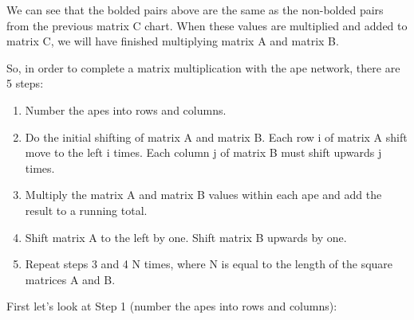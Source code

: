 \documentclass[10pt]{article}
\begin{document}
We can see that the bolded pairs above are the same as the non-bolded pairs from the previous matrix C chart.  When these values are multiplied and added to matrix C, we will have finished multiplying matrix A and matrix B. \par
So, in order to complete a matrix multiplication with the ape network, there are 5 steps: \par
\begin{enumerate}
\item Number the apes into rows and columns.
\item Do the initial shifting of matrix A and matrix B.  Each row i of matrix A shift move to the left i times.  Each column j of matrix B must shift upwards j times.
\item Multiply the matrix A and matrix B values within each ape and add the result to a running total.
\item Shift matrix A to the left by one.  Shift matrix B upwards by one. \par
\item Repeat steps 3 and 4 N times, where N is equal to the length of the square matrices A and B.
\end{enumerate}
First let’s look at Step 1 (number the apes into rows and columns): \par
\end{document}
